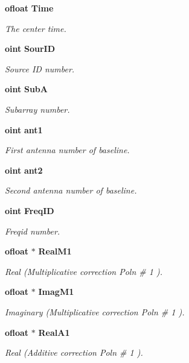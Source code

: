\begin{CompactItemize}
{\bf ofloat} {\bf Time}
\begin{CompactList}\small\item\em The center time. \item\end{CompactList}\item 
{\bf oint} {\bf Sour\-ID}
\begin{CompactList}\small\item\em Source ID number. \item\end{CompactList}\item 
{\bf oint} {\bf Sub\-A}
\begin{CompactList}\small\item\em Subarray number. \item\end{CompactList}\item 
{\bf oint} {\bf ant1}
\begin{CompactList}\small\item\em First antenna number of baseline. \item\end{CompactList}\item 
{\bf oint} {\bf ant2}
\begin{CompactList}\small\item\em Second antenna number of baseline. \item\end{CompactList}\item 
{\bf oint} {\bf Freq\-ID}
\begin{CompactList}\small\item\em Freqid number. \item\end{CompactList}\item 
{\bf ofloat} $\ast$ {\bf Real\-M1}
\begin{CompactList}\small\item\em Real (Multiplicative correction Poln \# 1 ). \item\end{CompactList}\item 
{\bf ofloat} $\ast$ {\bf Imag\-M1}
\begin{CompactList}\small\item\em Imaginary (Multiplicative correction Poln \# 1 ). \item\end{CompactList}\item 
{\bf ofloat} $\ast$ {\bf Real\-A1}
\begin{CompactList}\small\item\em Real (Additive correction Poln \# 1 ). \item\end{CompactList}\item 

\end{CompactItemize}
